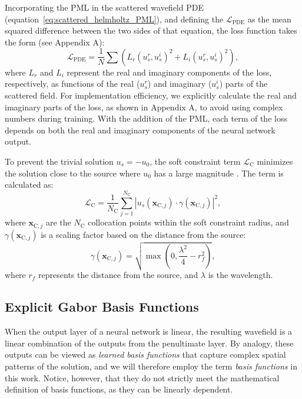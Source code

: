 \documentclass[authoryear, preprint, 12pt]{elsarticle}
\begin{document}
		Incorporating the PML in the scattered wavefield PDE (equation~\ref {eq:scattered_helmholtz_PML}), and defining the $\mathcal{L}_{\text{PDE}}$ as the mean squared difference between the two sides of that equation, the loss function takes the form (see Appendix A):  
\begin{equation}
	\mathcal{L}_{\text{PDE}} = \frac{1}{N} \sum \left( L_r(u_s^r, u_s^i)^2 + L_i(u_s^r, u_s^i)^2 \right),
	\label{eq:loss_pml}
\end{equation}
	where \( L_r \) and \( L_i \) represent the real and imaginary components of the loss, respectively, as functions of the real (\( u_s^r \)) and imaginary (\( u_s^i \)) parts of the scattered field. For implementation efficiency, we explicitly calculate the real and imaginary parts of the loss, as shown in Appendix A, to avoid using complex numbers during training. With the addition of the PML, each term of the loss depends on both the real and imaginary components of the neural network output.  
	
	
To prevent the trivial solution \(u_s = -u_0 \), the soft constraint term \( \mathcal{L}_{\text{C}} \) minimizes the solution close to the source where $ u_0 $ has a large magnitude \citep{huang2023b}. The term is calculated as:
	\begin{equation}
		\mathcal{L}_{\text{C}} = \frac{1}{N_{\text{C}}} \sum_{j=1}^{N_{\text{C}}} \left|u_s(\mathbf{x}_{\text{C},j}) \cdot \gamma(\mathbf{x}_{\text{C},j})\right|^2,
	\end{equation}
	where \( \mathbf{x}_{\text{C},j} \) are the \(N_{\text{C}}\) collocation points within the soft constraint  radius, and \( \gamma(\mathbf{x}_{\text{C},j}) \) is a scaling factor based on the distance from the source:
	\begin{equation}
		\gamma(\mathbf{x}_{\text{C},j}) =\sqrt{ \max\left(0, \frac{\lambda^2}{4} - r_f^2 \right)},
	\end{equation}
	where \(r_f\) represents the distance from the source, and \( \lambda \) is the wavelength. 


	
	

	\subsection{Explicit Gabor Basis Functions}
	
When the output layer of a neural network is linear, the resulting wavefield is a linear combination of the outputs from the penultimate layer. By analogy, these outputs can be viewed as \textit{learned basis functions} that capture complex spatial patterns of the solution, and we will therefore employ the term \textit{basis functions} in this work. Notice, however, that they do not strictly meet the mathematical definition of basis functions, as they can be linearly dependent.
\end{document}
